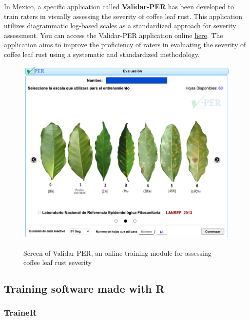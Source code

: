 \documentclass[
  letterpaper,
]{book}
\begin{document}
In Mexico, a specific application called \textbf{Validar-PER} has been
developed to train raters in visually assessing the severity of coffee
leaf rust. This application utilizes diagrammatic log-based scales as a
standardized approach for severity assessment. You can access the
Validar-PER application online
\href{http://royacafe.lanref.org.mx/ValidarPer/app/index.php}{here}. The
application aims to improve the proficiency of raters in evaluating the
severity of coffee leaf rust using a systematic and standardized
methodology.

\begin{figure}

{\centering 

\href{http://royacafe.lanref.org.mx/ValidarPer/app/index.php}{\includegraphics[width=4.47917in,height=\textheight]{imgs/validar-per.png}}

}

\caption{\label{fig-validar}Screen of Validar-PER, an online training
module for assessing coffee leaf rust severity}

\end{figure}

\hypertarget{training-software-made-with-r}{%
\subsection{Training software made with
R}\label{training-software-made-with-r}}

\hypertarget{trainer}{%
\subsubsection{TraineR}\label{trainer}}
\end{document}
